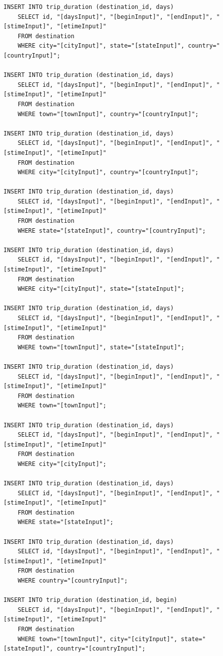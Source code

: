 \documentclass[letterpaper,10pt,onecolumn,compsoc]{IEEEtran}
\begin{document}
\begin{verbatim}
INSERT INTO trip_duration (destination_id, days) 
	SELECT id, "[daysInput]", "[beginInput]", "[endInput]", "[stimeInput]", "[etimeInput]" 
	FROM destination 
	WHERE city="[cityInput]", state="[stateInput]", country="[countryInput]";
	
INSERT INTO trip_duration (destination_id, days) 
	SELECT id, "[daysInput]", "[beginInput]", "[endInput]", "[stimeInput]", "[etimeInput]" 
	FROM destination 
	WHERE town="[townInput]", country="[countryInput]";
	
INSERT INTO trip_duration (destination_id, days) 
	SELECT id, "[daysInput]", "[beginInput]", "[endInput]", "[stimeInput]", "[etimeInput]" 
	FROM destination 
	WHERE city="[cityInput]", country="[countryInput]";
	
INSERT INTO trip_duration (destination_id, days) 
	SELECT id, "[daysInput]", "[beginInput]", "[endInput]", "[stimeInput]", "[etimeInput]" 
	FROM destination 
	WHERE state="[stateInput]", country="[countryInput]";
	
INSERT INTO trip_duration (destination_id, days) 
	SELECT id, "[daysInput]", "[beginInput]", "[endInput]", "[stimeInput]", "[etimeInput]" 
	FROM destination 
	WHERE city="[cityInput]", state="[stateInput]";
	
INSERT INTO trip_duration (destination_id, days) 
	SELECT id, "[daysInput]", "[beginInput]", "[endInput]", "[stimeInput]", "[etimeInput]" 
	FROM destination 
	WHERE town="[townInput]", state="[stateInput]";
	
INSERT INTO trip_duration (destination_id, days) 
	SELECT id, "[daysInput]", "[beginInput]", "[endInput]", "[stimeInput]", "[etimeInput]" 
	FROM destination 
	WHERE town="[townInput]";
	
INSERT INTO trip_duration (destination_id, days) 
	SELECT id, "[daysInput]", "[beginInput]", "[endInput]", "[stimeInput]", "[etimeInput]" 
	FROM destination 
	WHERE city="[cityInput]";
	
INSERT INTO trip_duration (destination_id, days) 
	SELECT id, "[daysInput]", "[beginInput]", "[endInput]", "[stimeInput]", "[etimeInput]" 
	FROM destination 
	WHERE state="[stateInput]";
	
INSERT INTO trip_duration (destination_id, days) 
	SELECT id, "[daysInput]", "[beginInput]", "[endInput]", "[stimeInput]", "[etimeInput]" 
	FROM destination 
	WHERE country="[countryInput]";
	
INSERT INTO trip_duration (destination_id, begin) 
	SELECT id, "[daysInput]", "[beginInput]", "[endInput]", "[stimeInput]", "[etimeInput]" 
	FROM destination 
	WHERE town="[townInput]", city="[cityInput]", state="[stateInput]", country="[countryInput]";
	

\end{verbatim}
\end{document}
